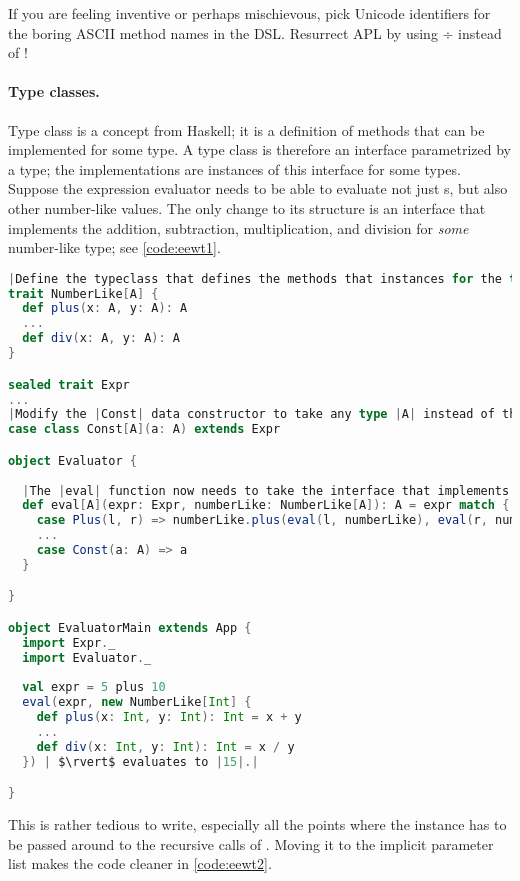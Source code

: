 \documentclass[10 pt]{article}
\begin{document}
\begin{example}
If you are feeling inventive or perhaps mischievous, pick Unicode identifiers for the boring ASCII method names in the DSL. Resurrect APL by using ÷ instead of !
\end{example}

\paragraph{Type classes.} Type class is a concept from Haskell\cite{haskell}; it is a definition of methods that can be implemented for some type. A type class is therefore an interface parametrized by a type; the implementations are instances of this interface for some types. Suppose the expression evaluator needs to be able to evaluate not just s, but also other number-like values. The only change to its structure is an interface that implements the addition, subtraction, multiplication, and division for \emph{some} number-like type; see \autoref{code:eewt1}.

\begin{lstlisting}[caption={Expression evaluator without typeclasses}, label={code:eewt1}, language=Scala, escapechar=|]
|Define the typeclass that defines the methods that instances for the type |A| must implement.|
trait NumberLike[A] {
  def plus(x: A, y: A): A
  ...
  def div(x: A, y: A): A
}

sealed trait Expr
...
|Modify the |Const| data constructor to take any type |A| instead of the concrete |Int|.|
case class Const[A](a: A) extends Expr

object Evaluator {
 
  |The |eval| function now needs to take the interface that implements the number-like behaviour for type |A|.| 
  def eval[A](expr: Expr, numberLike: NumberLike[A]): A = expr match {
    case Plus(l, r) => numberLike.plus(eval(l, numberLike), eval(r, numberLike))
    ...
    case Const(a: A) => a
  }

}

object EvaluatorMain extends App {
  import Expr._
  import Evaluator._
  
  val expr = 5 plus 10
  eval(expr, new NumberLike[Int] {
    def plus(x: Int, y: Int): Int = x + y
    ...
    def div(x: Int, y: Int): Int = x / y
  }) | $\rvert$ evaluates to |15|.|

}
\end{lstlisting}

This is rather tedious to write, especially all the points where the  instance has to be passed around to the recursive calls of . Moving it to the implicit parameter list makes the code cleaner in \autoref{code:eewt2}.
\end{document}
